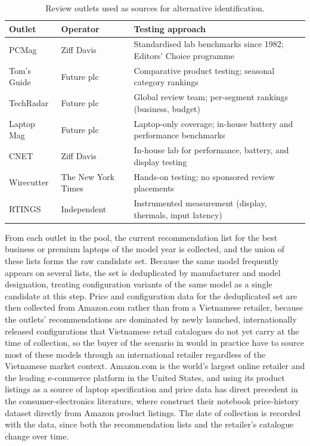 \begin{table}[htbp]
  \centering
  \caption{Review outlets used as sources for alternative identification.}
  \label{tab:review-sources}
  \begin{tabularx}{\textwidth}{@{}L{2.4cm}L{3.8cm}Y@{}}
    \toprule
    \textbf{Outlet} & \textbf{Operator} & \textbf{Testing approach} \\
    \midrule
    PCMag        & Ziff Davis          & Standardised lab benchmarks since 1982; Editors' Choice programme \\
    Tom's Guide  & Future plc          & Comparative product testing; seasonal category rankings \\
    TechRadar    & Future plc          & Global review team; per-segment rankings (business, budget) \\
    Laptop Mag   & Future plc          & Laptop-only coverage; in-house battery and performance benchmarks \\
    CNET         & Ziff Davis          & In-house lab for performance, battery, and display testing \\
    Wirecutter   & The New York Times  & Hands-on testing; no sponsored review placements \\
    RTINGS       & Independent         & Instrumented measurement (display, thermals, input latency) \\
    \bottomrule
  \end{tabularx}
\end{table}

From each outlet in the pool, the current recommendation list for the best business or
premium laptops of the model year is collected, and the union of these lists forms the raw
candidate set. Because the same model frequently appears on several lists, the set is
deduplicated by manufacturer and model designation, treating configuration variants of the
same model as a single candidate at this step. Price and configuration data for the
deduplicated set are then collected from Amazon.com rather than from a Vietnamese retailer,
because the outlets' recommendations are dominated by newly launched, internationally
released configurations that Vietnamese retail catalogues do not yet carry at the time of
collection, so the buyer of the scenario in  would in practice
have to source most of these models through an international retailer regardless of the
Vietnamese market context. Amazon.com is the world's largest online retailer and the
leading e-commerce platform in the United States, and using its product listings as a
source of laptop specification and price data has direct precedent in the
consumer-electronics literature, where \textcite{rau_optimal_2018} construct their
notebook price-history dataset directly from Amazon product listings. The date of collection is
recorded with the data, since both the recommendation lists and the retailer's catalogue
change over time.

